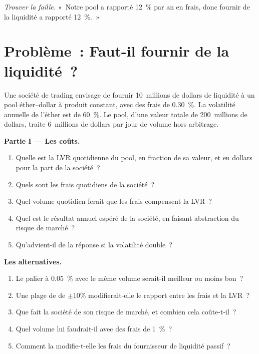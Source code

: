 \begin{exercise}[$\star\star\star$]\label{exo:m3:automated-market-makers:8}
\emph{Trouver la faille.} «~Notre pool a rapporté 12~\% par an en frais, donc fournir de la liquidité a rapporté 12~\%.~»
\end{exercise}

\section{Problème~: Faut-il fournir de la liquidité~?}

\begin{problem}\label{pb:m3:automated-market-makers:1}
Une société de trading envisage de fournir 10~millions de dollars de liquidité à un pool éther--dollar à produit constant, avec des frais de 0.30~\%. La volatilité annuelle de l'éther est de 60~\%.
Le pool, d'une valeur totale de 200~millions de dollars, traite 6~millions de dollars par jour de volume hors arbitrage.

\medskip\noindent\textbf{Partie I --- Les coûts.}
\begin{enumerate}
\item Quelle est la LVR quotidienne du pool, en fraction de sa valeur, et en dollars pour la part de la société~?
\item Quels sont les frais quotidiens de la société~?
\item Quel volume quotidien ferait que les frais compensent la LVR~?
\item Quel est le résultat annuel espéré de la société, en faisant abstraction du risque de marché~?
\item Qu'advient-il de la réponse si la volatilité double~?
\end{enumerate}

\medskip\noindent\textbf{Les alternatives.}
\begin{enumerate}[resume]
\item Le palier à 0.05~\% avec le même volume serait-il meilleur ou moins bon~?
\item Une plage de  de $\pm10\%$ modifierait-elle le rapport entre les frais et la LVR~?
\item Que fait la société de son risque de marché, et combien cela coûte-t-il~?
\item Quel volume lui faudrait-il avec des frais de 1~\%~?
\item Comment la  modifie-t-elle les frais du fournisseur de liquidité passif~?
\end{enumerate}


\end{problem}
